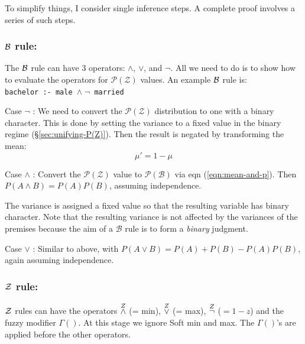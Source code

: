 To simplify things, I consider single inference steps.  A complete proof involves a series of such steps.

\subsubsection{$\mathcal{B}$ rule:}

The $\mathcal{B}$ rule can have 3 operators: $\wedge$, $\vee$, and $\neg$.  All we need to do is to show how to evaluate the operators for $\mathcal{P(Z)}$ values.  An example $\mathcal{B}$ rule is:\\
\hspace*{1cm} \texttt{bachelor :- male $\wedge \; \neg$ married}

Case $\neg$ :  We need to convert the $\mathcal{P(Z)}$ distribution to one with a binary character.  This is done by setting the variance to a fixed value in the binary regime (\S\ref{sec:unifying-P(Z)}).  Then the result is negated by transforming the mean:
\begin{equation}
\mu ' = 1 - \mu
\label{eqn:1-minus-z-transform}
\end{equation}

Case $\wedge$ : Convert the $\mathcal{P(Z)}$ value to $\mathcal{P(B)}$ via eqn (\ref{eqn:mean-and-p}).  Then $P(A \wedge B) = P(A) P(B)$, assuming independence.

The variance is assigned a fixed value so that the resulting variable has binary character.  Note that the resulting variance is not affected by the variances of the premises because the aim of a $\mathcal{B}$ rule is to form a \textit{binary} judgment.

Case $\vee$ : Similar to above, with $P(A \vee B) = P(A) + P(B) - P(A)P(B)$, again assuming independence.

\subsubsection{$\mathcal{Z}$ rule:}

$\mathcal{Z}$ rules can have the operators $\stackrel{Z}{\wedge}$ (= min), $\stackrel{Z}{\vee}$ (= max), $\stackrel{Z}{\neg}$ ($= 1-z$) and the fuzzy modifier $\Gamma()$.  At this stage we ignore Soft min and max.  The $\Gamma()$'s are applied before the other operators.

